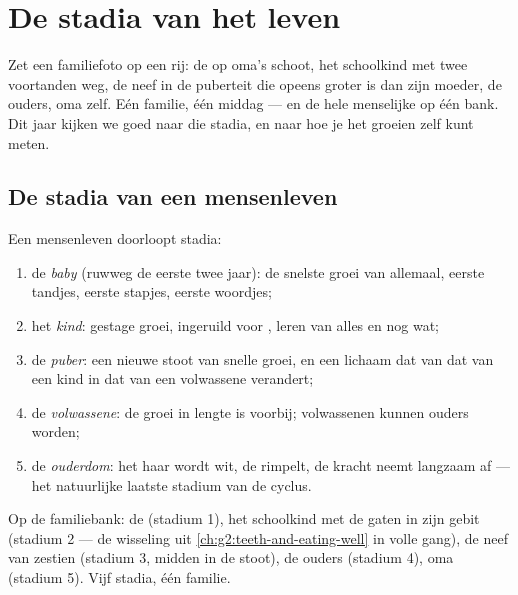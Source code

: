 \chapter{De stadia van het leven}\label{ch:g3:stages-of-life}

Zet een familiefoto op een rij: de  op oma's schoot, het schoolkind
met twee voortanden weg, de neef in de puberteit die opeens groter is
dan zijn moeder, de ouders, oma zelf. Eén familie, één middag --- en de
hele menselijke  op één bank. Dit jaar kijken we goed naar
die stadia, en naar hoe je het groeien zelf kunt meten.

\section{De stadia van een mensenleven}

\begin{definition}\label{def:g3:stages-of-life:stages}
Een mensenleven doorloopt stadia:
\begin{enumerate}
  \item de \emph{baby} (ruwweg de eerste twee jaar): de
        snelste groei van allemaal, eerste tandjes, eerste stapjes,
        eerste woordjes;
  \item het \emph{kind}: gestage groei,  ingeruild
        voor , leren van alles en nog wat;
  \item de \emph{puber}: een nieuwe stoot van snelle groei,
        en een lichaam dat van dat van een kind in dat van een
        volwassene verandert;
  \item de \emph{volwassene}: de groei in lengte is
        voorbij; volwassenen kunnen ouders worden;
  \item de \emph{ouderdom}: het haar wordt wit, de 
        rimpelt, de kracht neemt langzaam af --- het natuurlijke laatste
        stadium van de cyclus.
\end{enumerate}
\end{definition}

\begin{example}\label{ex:g3:stages-of-life:sofa}
Op de familiebank: de  (stadium 1), het schoolkind met de gaten in
zijn gebit (stadium 2 --- de wisseling uit
\cref{ch:g2:teeth-and-eating-well} in volle gang), de neef van zestien
(stadium 3, midden in de stoot), de ouders (stadium 4), oma (stadium 5).
Vijf stadia, één familie.
\end{example}


